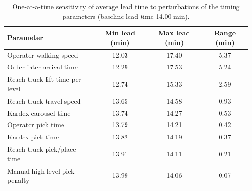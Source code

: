 \begin{table}[htbp]
\centering
\caption{One-at-a-time sensitivity of average lead time to perturbations of the
timing parameters (baseline lead time 14.00 min).}
\label{tab:sensitivity}
\small
\begin{tabular}{lccc}
\toprule
Parameter & Min lead (min) & Max lead (min) & Range (min) \\
\midrule
Operator walking speed & 12.03 & 17.40 & 5.37 \\
Order inter-arrival time & 12.29 & 17.53 & 5.24 \\
Reach-truck lift time per level & 12.74 & 15.33 & 2.59 \\
Reach-truck travel speed & 13.65 & 14.58 & 0.93 \\
Kardex carousel time & 13.74 & 14.27 & 0.53 \\
Operator pick time & 13.79 & 14.21 & 0.42 \\
Kardex pick time & 13.82 & 14.19 & 0.37 \\
Reach-truck pick/place time & 13.91 & 14.11 & 0.21 \\
Manual high-level pick penalty & 13.99 & 14.06 & 0.07 \\
\bottomrule
\end{tabular}
\end{table}
